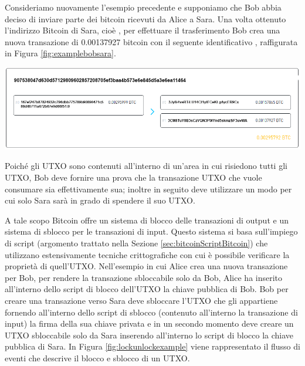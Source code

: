 \begin{example}
Consideriamo nuovamente l'esempio precedente  e supponiamo che Bob abbia deciso di inviare parte dei bitcoin ricevuti da Alice a Sara. Una volta ottenuto l’indirizzo Bitcoin di Sara, cioè , per effettuare il trasferimento Bob  crea una nuova transazione di 0.00137927 bitcoin con il seguente identificativo , raffigurata in Figura \ref{fig:examplebobsara}.

{\centering
\vspace{15pt}
\includegraphics[scale=0.35]{images/example_bob_sara.png}
\vspace{10pt}
\par}


Poiché gli UTXO sono contenuti all’interno di un'area in cui risiedono tutti gli UTXO, Bob deve fornire una prova che la transazione UTXO che vuole consumare sia effettivamente sua; inoltre in seguito deve utilizzare un modo per cui solo Sara  sarà in grado di spendere il suo UTXO.

A tale scopo Bitcoin offre un sistema di blocco delle transazioni di output e un sistema di sblocco per le transazioni di input.  Questo sistema si basa sull'impiego di script (argomento trattato nella Sezione \ref{sec:bitcoinScriptBitcoin}) che utilizzano estensivamente tecniche crittografiche con cui è possibile verificare la proprietà di quell'UTXO.
Nell'esempio in cui Alice crea una nuova transazione per Bob, per rendere la transazione sbloccabile solo da Bob, Alice ha inserito all’interno dello script di blocco dell’UTXO la chiave pubblica di Bob.\newline
Bob per creare una transazione verso Sara deve sbloccare l’UTXO che gli appartiene fornendo all’interno dello script di sblocco (contenuto all’interno la transazione di input) la firma della sua chiave privata e in un secondo momento deve creare un UTXO sbloccabile solo da Sara inserendo all’interno lo script di blocco la chiave pubblica di Sara.\newline
In Figura \ref{fig:lockunlockexample} viene rappresentato il flusso di eventi che descrive il blocco e sblocco di un UTXO.


\end{example}
